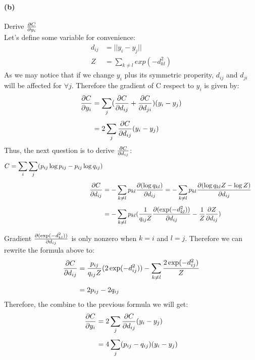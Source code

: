 \documentclass{article}
\begin{document}
\paragraph{(b)} Derive ${\partial C \over \partial y_i}$\\
Let's define some variable for convenience:
\begin{equation}
\begin{aligned}
d_{ij} &= ||y_i-y_j|| \\[0.4em]
Z &= \displaystyle\sum_{k \neq l} exp(-d_{kl}^2)
\end{aligned}
\end{equation}
As we may notice that if we change $y_i$ plus its symmetric properity, $d_{ij}$ and $d_{ji}$ will be affected for $\forall j$. Therefore the gradient of C respect to $y_i$ is given by:
\begin{equation}
\begin{aligned}
{\partial C \over \partial y_i} &= \displaystyle\sum_{j} ( {\partial C \over \partial d_{ij}} + {\partial C \over \partial d_{ji}} ) (y_i - y_j) \\[0.4em]
&= 2 \displaystyle\sum_{j} {\partial C \over \partial d_{ij}}(y_i - y_j)
\end{aligned}
\end{equation}
Thus, the next question is to derive ${\partial C \over \partial d_{ij}}$:
\begin{equation}
\begin{aligned}
C = \displaystyle\sum_{i} \sum_{j}(p_{ij}\log p_{ij} - p_{ij}\log q_{ij}) \\[0.4em]
{\partial C \over \partial d_{ij}} &= - \displaystyle\sum_{k \neq l}p_{kl}{\partial(\log q_{kl})\over \partial d_{ij}} = - \displaystyle\sum_{k \neq l}p_{kl}{\partial(\log q_{kl}Z - \log Z)\over \partial d_{ij}} \\[0.4em]
&= - \displaystyle\sum_{k \neq l} p_{kl}({1\over q_{ij}Z} {\partial (\exp(-d_{kl}^2)) \over \partial d_{ij} } - {1\over Z}{\partial Z \over \partial d_{ij}} ) \\[0.4em]
\end{aligned}
\end{equation}
Gradient ${\partial (\exp(-d_{kl}^2)) \over \partial d_{ij} }$ is only nonzero when $k = i$ and $l = j$. Therefore we can rewrite the formula above to:
\begin{equation}
\begin{aligned}
{\partial C \over \partial d_{ij}} &= {p_{ij}\over q_{ij}Z}(2 \exp(-d_{ij}^2)) - \displaystyle\sum_{k \neq l} {2\exp (-d_{ij}^2)\over Z}\\[0.4em]
&= 2p_{ij} - 2q_{ij}
\end{aligned}
\end{equation}
Therefore, the combine to the previous formula we will get:
\begin{equation}
\begin{aligned}
{\partial C \over \partial y_i} &= 2 \displaystyle\sum_{j} {\partial C \over \partial d_{ij}}(y_i - y_j) \\[0.4em]
&= 4 \displaystyle\sum_{j}(p_{ij}-q_{ij}) (y_i -y_j)

\end{aligned}
\end{equation}
\end{document}
